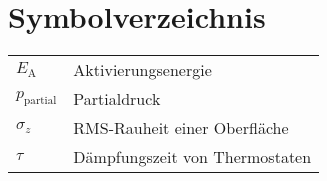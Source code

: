 \chapter*{Symbolverzeichnis}
\def\listacronymname{Symbolverzeichnis}

\begin{tabularx}{\linewidth}{ll}
$E_\text{A}$       & Aktivierungsenergie            \\
$p_\text{partial}$ & Partialdruck                   \\
$\sigma_z$         & RMS-Rauheit einer Oberfläche   \\
$\tau$             & Dämpfungszeit von Thermostaten \\
\end{tabularx}


\cleardoublepage
{} %
